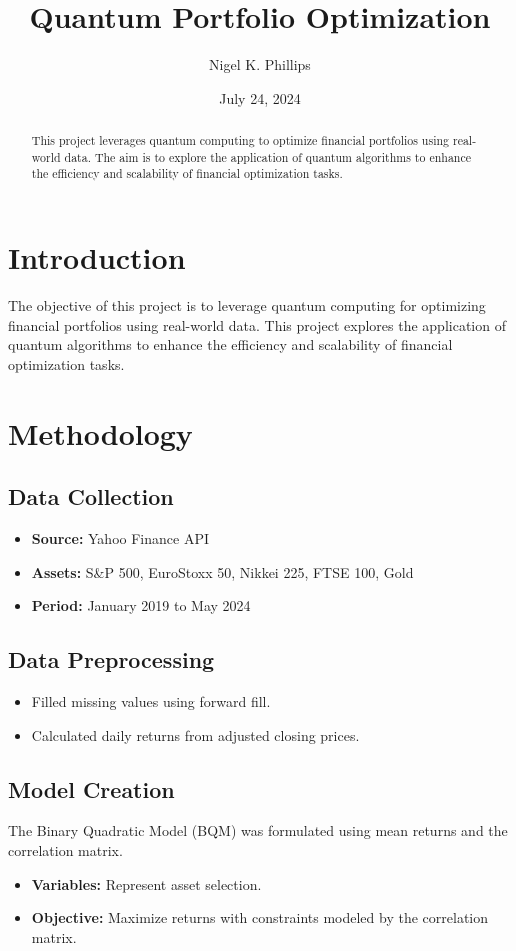 \documentclass{article}
\title{Quantum Portfolio Optimization}
\author{Nigel K. Phillips}
\date{July 24, 2024}
\begin{document}
\maketitle

\begin{abstract}
This project leverages quantum computing to optimize financial portfolios using real-world data. The aim is to explore the application of quantum algorithms to enhance the efficiency and scalability of financial optimization tasks.
\end{abstract}

\section{Introduction}
The objective of this project is to leverage quantum computing for optimizing financial portfolios using real-world data. This project explores the application of quantum algorithms to enhance the efficiency and scalability of financial optimization tasks.

\section{Methodology}
\subsection{Data Collection}
\begin{itemize}
    \item \textbf{Source:} Yahoo Finance API
    \item \textbf{Assets:} S\&P 500, EuroStoxx 50, Nikkei 225, FTSE 100, Gold
    \item \textbf{Period:} January 2019 to May 2024
\end{itemize}

\subsection{Data Preprocessing}
\begin{itemize}
    \item Filled missing values using forward fill.
    \item Calculated daily returns from adjusted closing prices.
\end{itemize}

\subsection{Model Creation}
The Binary Quadratic Model (BQM) was formulated using mean returns and the correlation matrix.
\begin{itemize}
    \item \textbf{Variables:} Represent asset selection.
    \item \textbf{Objective:} Maximize returns with constraints modeled by the correlation matrix.
\end{itemize}
\end{document}
